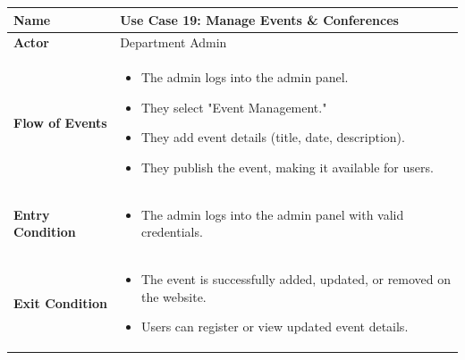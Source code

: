 \documentclass[11pt]{article}
\begin{document}
\begin{center}
\begin{tabular}{ | >{\bfseries}m{6em} | m{10cm} | }
  \hline
  \textbf{Name} & Use Case 19: Manage Events \& Conferences \\
  \hline
  \textbf{Actor} & Department Admin \\
  \hline
  \textbf{Flow of Events} & 
  \begin{itemize}
      \item The admin logs into the admin panel.
      \item They select "Event Management."
      \item They add event details (title, date, description).
      \item They publish the event, making it available for users.
  \end{itemize} \\
  \hline
  \textbf{Entry Condition} & 
        \begin{itemize}
  \item The admin logs into the admin panel with valid credentials.
    \end{itemize} \\
  \hline
  \textbf{Exit Condition} & 
      \begin{itemize}
          \item The event is successfully added, updated, or removed on the website.
          \item Users can register or view updated event details.
      \end{itemize} \\
      \hline
    \end{tabular}
    \end{center}


\newpage
\end{document}
